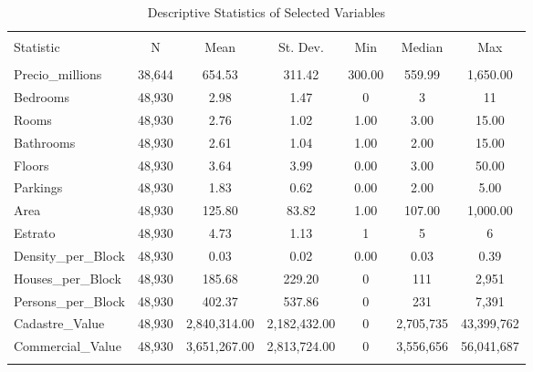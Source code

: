 
\begin{table}[!htbp] \centering 
  \caption{Descriptive Statistics of Selected Variables} 
  \label{} 
\begin{tabular}{@{\extracolsep{5pt}}lcccccc} 
\\[-1.8ex]\hline 
\hline \\[-1.8ex] 
Statistic & \multicolumn{1}{c}{N} & \multicolumn{1}{c}{Mean} & \multicolumn{1}{c}{St. Dev.} & \multicolumn{1}{c}{Min} & \multicolumn{1}{c}{Median} & \multicolumn{1}{c}{Max} \\ 
\hline \\[-1.8ex] 
Precio\_millions & 38,644 & 654.53 & 311.42 & 300.00 & 559.99 & 1,650.00 \\ 
Bedrooms & 48,930 & 2.98 & 1.47 & 0 & 3 & 11 \\ 
Rooms & 48,930 & 2.76 & 1.02 & 1.00 & 3.00 & 15.00 \\ 
Bathrooms & 48,930 & 2.61 & 1.04 & 1.00 & 2.00 & 15.00 \\ 
Floors & 48,930 & 3.64 & 3.99 & 0.00 & 3.00 & 50.00 \\ 
Parkings & 48,930 & 1.83 & 0.62 & 0.00 & 2.00 & 5.00 \\ 
Area & 48,930 & 125.80 & 83.82 & 1.00 & 107.00 & 1,000.00 \\ 
Estrato & 48,930 & 4.73 & 1.13 & 1 & 5 & 6 \\ 
Density\_per\_Block & 48,930 & 0.03 & 0.02 & 0.00 & 0.03 & 0.39 \\ 
Houses\_per\_Block & 48,930 & 185.68 & 229.20 & 0 & 111 & 2,951 \\ 
Persons\_per\_Block & 48,930 & 402.37 & 537.86 & 0 & 231 & 7,391 \\ 
Cadastre\_Value & 48,930 & 2,840,314.00 & 2,182,432.00 & 0 & 2,705,735 & 43,399,762 \\ 
Commercial\_Value & 48,930 & 3,651,267.00 & 2,813,724.00 & 0 & 3,556,656 & 56,041,687 \\ 
\hline \\[-1.8ex] 
\end{tabular} 
\end{table} 
